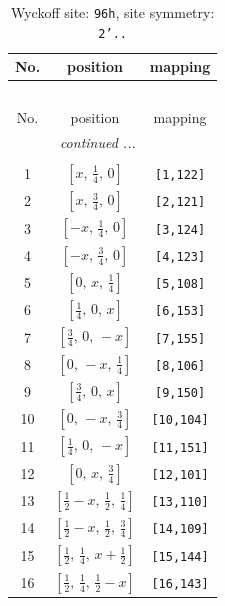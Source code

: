 \documentclass[fleqn,8pt]{jsarticle}
\begin{document}
\begin{longtable}{ccc}
\caption{Wyckoff site: {\tt 96h}, site symmetry: {\tt 2'..}}
 \\
 \hline \hline
No. & position & mapping \\ \hline \endfirsthead

\multicolumn{2}{l}{\tablename\ \thetable{}} \\
 \hline \hline
No. & position & mapping \\ \hline \endhead

 \hline \hline
\multicolumn{2}{r}{\footnotesize\it continued ...} \\ \endfoot

 \hline \hline
\multicolumn{2}{r}{} \\ \endlastfoot

1 & $\left[ x,\, \frac{1}{4},\, 0 \right]$ & {\tt [1,122]} \\ \hline
2 & $\left[ x,\, \frac{3}{4},\, 0 \right]$ & {\tt [2,121]} \\ \hline
3 & $\left[ - x,\, \frac{1}{4},\, 0 \right]$ & {\tt [3,124]} \\ \hline
4 & $\left[ - x,\, \frac{3}{4},\, 0 \right]$ & {\tt [4,123]} \\ \hline
5 & $\left[ 0,\, x,\, \frac{1}{4} \right]$ & {\tt [5,108]} \\ \hline
6 & $\left[ \frac{1}{4},\, 0,\, x \right]$ & {\tt [6,153]} \\ \hline
7 & $\left[ \frac{3}{4},\, 0,\, - x \right]$ & {\tt [7,155]} \\ \hline
8 & $\left[ 0,\, - x,\, \frac{1}{4} \right]$ & {\tt [8,106]} \\ \hline
9 & $\left[ \frac{3}{4},\, 0,\, x \right]$ & {\tt [9,150]} \\ \hline
10 & $\left[ 0,\, - x,\, \frac{3}{4} \right]$ & {\tt [10,104]} \\ \hline
11 & $\left[ \frac{1}{4},\, 0,\, - x \right]$ & {\tt [11,151]} \\ \hline
12 & $\left[ 0,\, x,\, \frac{3}{4} \right]$ & {\tt [12,101]} \\ \hline
13 & $\left[ \frac{1}{2} - x,\, \frac{1}{2},\, \frac{1}{4} \right]$ & {\tt [13,110]} \\ \hline
14 & $\left[ \frac{1}{2} - x,\, \frac{1}{2},\, \frac{3}{4} \right]$ & {\tt [14,109]} \\ \hline
15 & $\left[ \frac{1}{2},\, \frac{1}{4},\, x + \frac{1}{2} \right]$ & {\tt [15,144]} \\ \hline
16 & $\left[ \frac{1}{2},\, \frac{1}{4},\, \frac{1}{2} - x \right]$ & {\tt [16,143]} \\ \hline

\end{longtable}
\end{document}
